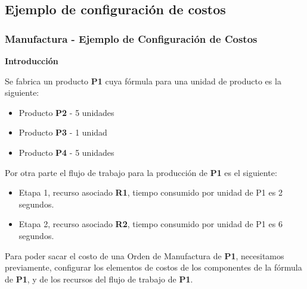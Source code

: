 \documentclass[letterpaper,10pt,spanish]{sphinxmanual}
\begin{document}
\subsection{Ejemplo de configuración de costos}
\label{manufactura-costos:ejemplo-de-configuracion-de-costos}

\subsubsection{Manufactura - Ejemplo de Configuración de Costos}
\label{manufactura-costos-ejemplo:manufactura-ejemplo-de-configuracion-de-costos}\label{manufactura-costos-ejemplo::doc}
\textbf{Introducción}

Se fabrica un producto \textbf{P1} cuya fórmula para una unidad de producto es la siguiente:
\begin{itemize}
\item {} 
Producto \textbf{P2} - 5 unidades

\item {} 
Producto \textbf{P3} - 1 unidad

\item {} 
Producto \textbf{P4} - 5 unidades

\end{itemize}

Por otra parte el flujo de trabajo para la producción de \textbf{P1} es el siguiente:
\begin{itemize}
\item {} 
Etapa 1, recurso asociado \textbf{R1}, tiempo consumido por unidad de P1 es 2 segundos.

\item {} 
Etapa 2, recurso asociado \textbf{R2}, tiempo consumido por unidad de P1 es 6 segundos.

\end{itemize}

Para poder sacar el costo de una Orden de Manufactura de \textbf{P1}, necesitamos previamente, configurar los elementos de costos de los componentes de la fórmula de \textbf{P1}, y de los recursos del flujo de trabajo de \textbf{P1}.
\end{document}

